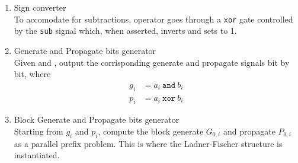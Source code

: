 \begin{enumerate}
    \item Sign converter \\
    To accomodate for subtractions, operator  goes through a \texttt{xor} gate controlled by the
    \texttt{sub} signal which, when asserted, inverts  and sets  to 1.

    \item Generate and Propagate bits generator \\
    Given  and , output the corrisponding generate and propagate signals bit by bit, where
    \begin{align*}
        g_i &= a_i\ \texttt{and}\ b_i \\
        p_i &= a_i\ \texttt{xor}\ b_i
    \end{align*}

    \item Block Generate and Propagate bits generator \\
    Starting from $g_i$ and $p_i$, compute the block generate $G_{0, i}$ and propagate $P_{0, i}$ as a parallel prefix
    problem. This is where the Ladner-Fischer structure is instantiated.


\end{enumerate}
